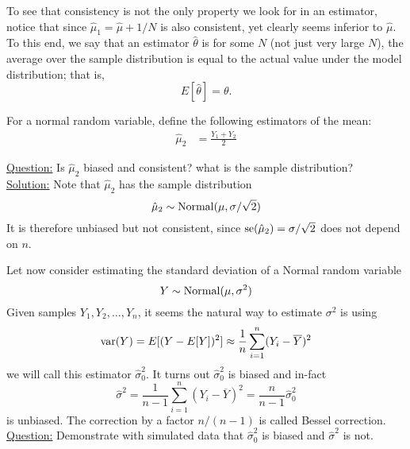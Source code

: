 To see that consistency is not the only property we look for in an estimator, notice that since $\hat{\mu}_1 = \hat{\mu} + 1/N$ is also consistent, yet clearly seems inferior to $\hat{\mu}$. To this end, we say that an estimator $\hat{\theta}$ is  for some $N$ (not just very large $N$), the average over the sample distribution is equal to the actual value under the model distribution; that is, 
\begin{equation*}
E[\hat{\theta}] = \theta. 
\end{equation*} 

\begin{example}
For a normal random variable, define the following estimators of the mean:
\begin{align*}
\hat{\mu}_2 &= \frac{Y_1 + Y_2}{2}
\end{align*}

\noindent
\underline{Question:}  Is $\hat{\mu}_2$ biased and consistent? what is the sample distribution?\\


\noindent
\underline{Solution:}
Note that $\hat{\mu}_2$ has the sample distribution 
\begin{equation*}
\hat{\mu}_2  \sim {\rm Normal}(\mu,\sigma/\sqrt{2})
\end{equation*}
It is therefore unbiased but not consistent, since ${\rm se}(\hat{\mu}_2) = \sigma/\sqrt{2}$ does not depend on $n$. 
\end{example}


\begin{example}
Let now consider estimating the standard deviation of a Normal random variable
\begin{equation*}
Y \sim {\rm Normal}(\mu,\sigma^2)
\end{equation*}
Given samples $Y_1,Y_2,\dots,Y_n$, it seems the natural way to estimate $\sigma^2$ is using
\begin{equation*}
{\rm var}(Y) = E[(Y-E[Y])^2] \approx \frac{1}{n}\sum_{i=1}^n(Y_i-\overline{Y})^2
\end{equation*}
we will call this estimator $\hat{\sigma}_0^2$. It turns out $\hat{\sigma}_0^2$ is biased and in-fact 
\begin{equation*}
\hat{\sigma}^2 = \frac{1}{n-1}\sum_{i=1}^n(Y_i-\overline{Y})^2 = \frac{n}{n-1}\hat{\sigma}_0^2
\end{equation*}
is unbiased. The correction by a factor $n/(n-1)$ is called Bessel correction. \\

\noindent
\underline{Question:} Demonstrate with simulated data that $\hat{\sigma}_0^2$ is biased and $\hat{\sigma}^2$ is not. 


\end{example}






